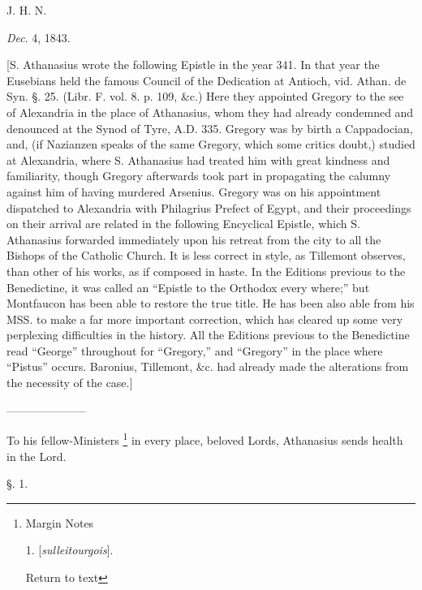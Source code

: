 J. H. N.

\emph{Dec}. 4,
1843.


[S. Athanasius wrote the following Epistle in the
year 341. In that year the Eusebians held the famous Council of the
Dedication at Antioch, vid. Athan. de Syn. §. 25. (Libr. F. vol. 8.
p. 109, \&c.) Here they appointed Gregory to the see of Alexandria
in the place of Athanasius, whom they had already condemned and
denounced at the Synod of Tyre, A.D.
335. Gregory was by
birth a Cappadocian, and, (if Nazianzen speaks of the same Gregory,
which some critics doubt,) studied at Alexandria, where S. Athanasius
had treated him with great kindness and familiarity, though Gregory
afterwards took part in propagating the calumny against him of having
murdered Arsenius. Gregory was on his appointment dispatched to
Alexandria with Philagrius Prefect of Egypt, and their proceedings on
their arrival are related in the following Encyclical Epistle, which
S. Athanasius forwarded immediately upon his retreat from the city to
all the Bishops of the Catholic Church. It is less correct in style,
as Tillemont observes, than other of his works, as if composed in
haste. In the Editions previous to the Benedictine, it was called an ``Epistle
to the Orthodox every where;'' but Montfaucon has been able to restore
the true title. He has been also able from his MSS. to make a far more
important correction, which has cleared up some very perplexing
difficulties in the history. All the Editions previous to the
Benedictine read ``George'' throughout for ``Gregory,'' and ``Gregory'' in
the place where ``Pistus'' occurs. Baronius, Tillemont, \&c. had
already made the alterations from the necessity of the case.]

———————

To his fellow-Ministers \footnote{Margin Notes

1. [\emph{sulleitourgois}].

Return to text} in every place, beloved Lords, Athanasius sends health in the
Lord.

§. 1.

